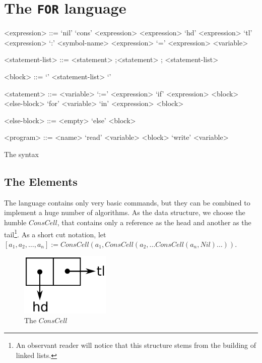 \section{The {\tt FOR} language}
\label{sec:FOR}
\begin{table}[htb]
	\begin{grammar}
		<expression> ::= 
							`nil' 
				\alt 	`cons' <expression> <expression>
				\alt 	`hd' <expression>
				\alt 	`tl' <expression>
				\alt		`:' <symbol-name>
				\alt		<expression> `=' <expression>
				\alt 	<variable>

		<statement-list> ::= <statement> ;\alt <statement> ; <statement-list>

		<block> ::= `{' <statement-list> `}'

		<statement> ::=
							<variable> `:=' <expression>
				\alt	`if' <expression> <block> <else-block>
				\alt	`for' <variable> `in' <expression> <block>
			
				<else-block> ::= <empty> \alt `else' <block>
				
				<program> ::= <name> `read' <variable> <block> `write' <variable>
	\end{grammar}
	\caption{The \FOR syntax \label{tab:FOR-syntax}}
\end{table}

\subsection{The Elements} %
\label{sub:TheElements}
The \FOR language contains only very basic commands, but they can be combined
to implement a huge number of algorithms. As the data structure, we choose 
the humble $ConsCell$, that contains only a reference as the head and 
another as the tail\footnote{An observant reader will notice that this
structure stems from the building of linked lists.}. As a short cut notation, let $[a_1, a_2, \dots, a_n] := ConsCell(a_1, ConsCell(a_2, \dots ConsCell(a_n, Nil)\dots ))$.
\begin{figure}[htb]
	\begin{center}
		\includegraphics[height=3cm]{introduction/for/images/conscell}
	\end{center}
	\caption{The $ConsCell$}
\end{figure}

